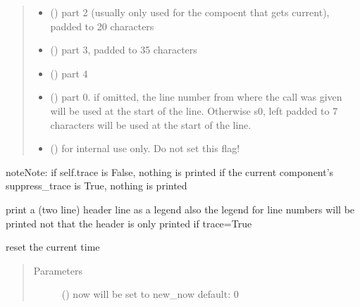\documentclass[letterpaper,10pt,english]{sphinxmanual}
\begin{document}
\begin{fulllineitems}
\begin{fulllineitems}
\begin{quote}
\begin{description}
\begin{itemize}
\item {} 
 () \textendash{} part 2 (usually only used for the compoent that gets current), padded to 20 characters

\item {} 
 () \textendash{} part 3, padded to 35 characters

\item {} 
 () \textendash{} part 4

\item {} 
 () \textendash{} part 0. if omitted, the line number from where the call was given will be used at
the start of the line. Otherwise s0, left padded to 7 characters will be used at
the start of the line.

\item {} 
 () \textendash{} for internal use only. Do not set this flag!

\end{itemize}

\end{description}\end{quote}

\begin{sphinxadmonition}{note}{Note:}
if self.trace is False, nothing is printed 
if the current component’s suppress\_trace is True, nothing is printed 
\end{sphinxadmonition}

\end{fulllineitems}


\begin{fulllineitems}
\label{\detokenize{Reference:salabim.Environment.print_trace_header}}
print a (two line) header line as a legend 
also the legend for line numbers will be printed 
not that the header is only printed if trace=True

\end{fulllineitems}


\begin{fulllineitems}
\label{\detokenize{Reference:salabim.Environment.reset_now}}
reset the current time
\begin{quote}\begin{description}
\item[{Parameters}] \leavevmode
{} () \textendash{} now will be set to new\_now 
default: 0


\end{description}
\end{quote}
\end{fulllineitems}
\end{fulllineitems}
\end{document}
